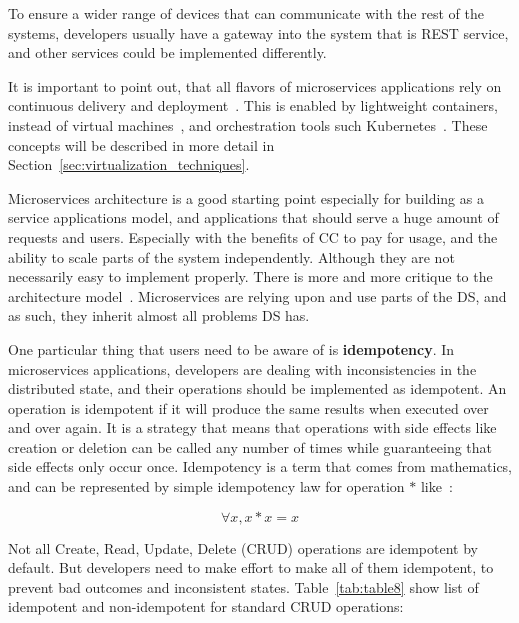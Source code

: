 To ensure a wider range of devices that can communicate with the rest of the systems, developers usually have a gateway into the system that is REST service, and other services could be implemented differently.

It is important to point out, that all flavors of microservices applications rely on continuous delivery and deployment~\cite{7436659}. This is enabled by lightweight containers, instead of virtual machines~\cite{FelterFRR15}, and orchestration tools such Kubernetes~\cite{BurnsGOBW16}. These concepts will be described in more detail in Section~\ref{sec:virtualization_techniques}.

Microservices architecture is a good starting point especially for building as a service applications model, and applications that should serve a huge amount of requests and users. Especially with the benefits of CC to pay for usage, and the ability to scale parts of the system independently.  Although they are not necessarily easy to implement properly. There is more and more critique to the architecture model~\cite{SoldaniTH18}. Microservices are relying upon and use parts of the DS, and as such, they inherit almost all problems DS has. 

One particular thing that users need to be aware of is \textbf{idempotency}. In microservices applications, developers are dealing with inconsistencies in the distributed state, and their operations should be implemented as idempotent. An operation is idempotent if it will produce the same results when executed over and over again. It is a strategy that means that operations with side effects like creation or deletion can be called any number of times while guaranteeing that side effects only occur once. Idempotency is a term that comes from mathematics, and can be represented by simple idempotency law for operation $*$ like~\cite{gratzer2002general}:

\begin{equation}\label{form:idempotency_law}
	\forall x, x * x = x
\end{equation}

Not all Create, Read, Update, Delete (CRUD) operations are idempotent by default. But developers need to make effort to make all of them idempotent, to prevent bad outcomes and inconsistent states. Table~\ref{tab:table8} show list of idempotent and non-idempotent for standard CRUD operations:

